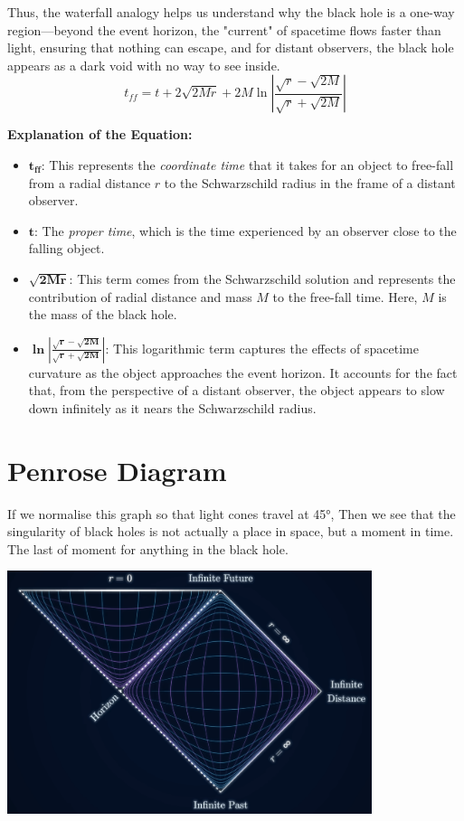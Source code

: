 \documentclass[12pt,a4paper]{article}
\begin{document}
Thus, the waterfall analogy helps us understand why the black hole is a one-way region—beyond the event horizon, the "current" of spacetime flows faster than light, ensuring that nothing can escape, and for distant observers, the black hole appears as a dark void with no way to see inside.
\[
t_{ff} = t + 2\sqrt{2Mr} + 2M \ln \left| \frac{\sqrt{r} - \sqrt{2M}}{\sqrt{r} + \sqrt{2M}} \right|
\]

\textbf{Explanation of the Equation:}

\begin{itemize}
    \item \(\mathbf{t_{ff}}\): This represents the \textit{coordinate time} that it takes for an object to free-fall from a radial distance \(r\) to the Schwarzschild radius in the frame of a distant observer. 
    \item \(\mathbf{t}\): The \textit{proper time}, which is the time experienced by an observer close to the falling object.
    \item \(\mathbf{\sqrt{2Mr}}\): This term comes from the Schwarzschild solution and represents the contribution of radial distance and mass \(M\) to the free-fall time. Here, \(M\) is the mass of the black hole.
    \item \(\mathbf{\ln \left| \frac{\sqrt{r} - \sqrt{2M}}{\sqrt{r} + \sqrt{2M}} \right|}\): This logarithmic term captures the effects of spacetime curvature as the object approaches the event horizon. It accounts for the fact that, from the perspective of a distant observer, the object appears to slow down infinitely as it nears the Schwarzschild radius.
    
\end{itemize}


\section{Penrose Diagram}
If we normalise this graph so that light cones travel at 45°, 
Then we see that the singularity of black holes is not 
actually a place in space, but a moment in time.
The last of moment for anything in the black hole.

\begin{center}
    \includegraphics[width=0.8\textwidth]{penrose}   \\ 
\end{center}
\end{document}
